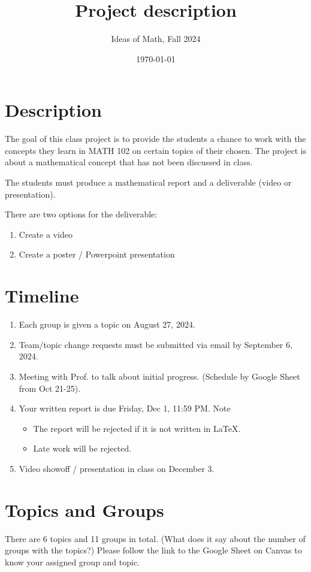 \documentclass[12pt]{amsart}
\title{ Project description }
\author{Ideas of Math, Fall 2024}
\date{\today}
\begin{document}
\maketitle


\section{Description}
The goal of this class project is to provide the students a chance to work with
the concepts they learn in MATH 102 on certain topics of their chosen.
The project is about a mathematical concept that has not been discussed in class.

The students must produce a mathematical report and a deliverable (video or presentation).

There are two options for the deliverable:
\begin{enumerate}
	\item Create a video
	\item Create a poster / Powerpoint presentation
\end{enumerate}

\section{Timeline}
\begin{enumerate}
	\item Each group is given a topic on August 27, 2024.
	\item Team/topic change requests must be submitted via email by September 6, 2024.
	\item Meeting with Prof. to talk about initial progress.
	      (Schedule by Google Sheet from Oct 21-25).
	\item Your written report is due Friday, Dec 1, 11:59 PM. Note
	      \begin{itemize}
		      \item The report will be rejected if it is not written in LaTeX.
		      \item Late work will be rejected.
	      \end{itemize}
	\item Video showoff / presentation in class on December 3.
\end{enumerate}

\section{Topics and Groups}
There are 6 topics and 11 groups in total. (What does it say about the number of groups with the topics?)
Please follow the link to the Google Sheet on Canvas to know your assigned group and topic.
\end{document}
